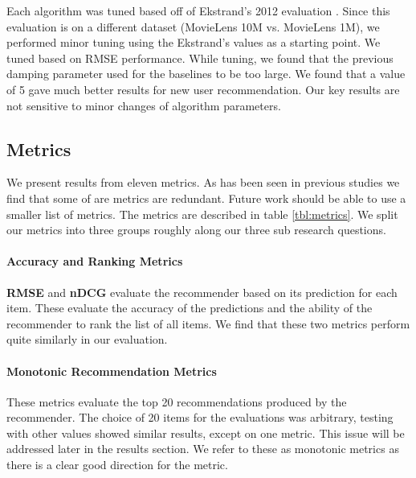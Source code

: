 \documentclass[letterpaper]{sig-alternate}
\begin{document}
  
  Each algorithm was tuned based off of Ekstrand's 2012 evaluation \cite{ekstrand2012recommenders}.
  Since this evaluation is on a different dataset (MovieLens 10M vs. MovieLens 1M), we performed minor tuning using the Ekstrand's values as a starting point.
  We tuned based on RMSE performance.
  While tuning, we found that the previous damping parameter used for the baselines to be too large.
  We found that a value of 5 gave much better results for new user recommendation.
  Our key results are not sensitive to minor changes of algorithm parameters.  

  \subsection*{Metrics}


  We present results from eleven metrics.
  As has been seen in previous studies \cite{herlockerEvaluating} we find that some of are metrics are redundant.
  Future work should be able to use a smaller list of metrics.
  The metrics are described in table \ref{tbl:metrics}.
  We split our metrics into three groups roughly along our three sub research questions.
  
  \paragraph{Accuracy and Ranking Metrics}
  {\bf RMSE} and {\bf nDCG} evaluate the recommender based on its prediction for each item.
  These evaluate the accuracy of the predictions and the ability of the recommender to rank the list of all items.
  We find that these two metrics perform quite similarly in our evaluation.

  \addtocounter{footnote}{1}

  \paragraph{Monotonic Recommendation Metrics}
  These metrics evaluate the top 20 recommendations produced by the recommender.
  The choice of 20 items for the evaluations was arbitrary, testing with other values showed similar results, except on one metric.
  This issue will be addressed later in the results section.
  We refer to these as monotonic metrics as there is a clear good direction for the metric.
\end{document}
